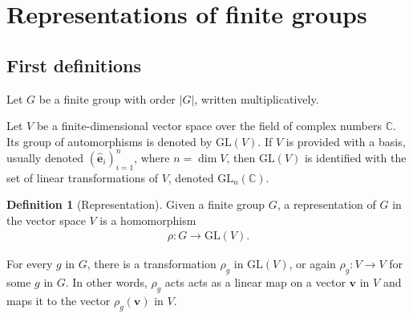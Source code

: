 \documentclass[12pt, a4paper, twoside]{article}
\theoremstyle{definition}
\newtheorem{definition}{Definition}[section]
\theoremstyle{remark}
\numberwithin{equation}{section}
\newcommand{\CC}{\mathbb{C}}
\newcommand{\1}{\mathbf{1}}
\newcommand{\0}{\mathbf{0}}
\newcommand{\GL}{\text{GL}}
\newcommand{\bas}{\mathbf{\hat{e}}}
\newcommand{\vvec}{\mathbf{v}}
\begin{document}





\clearpage{\thispagestyle{empty}\cleardoublepage}
{\hypersetup{linkcolor=black}
\tableofcontents
}

%

\section{Representations of finite groups}

\subsection{First definitions}

	Let $G$ be a finite group with order $|G|$, written multiplicatively.
	
	Let $V$ be a finite-dimensional vector space over the field of complex numbers $\CC$. Its group of automorphisms is denoted by $\GL(V)$. If $V$ is provided with a basis, usually denoted $(\bas_i)_{i=1}^n$, where $n = \dim V$, then $\GL(V)$ is identified with the set of linear transformations of $V$, denoted $\GL_n(\CC)$\cite[18.1]{DummitFoote}.
	
	\begin{definition}[Representation]\cite{Serre}
		Given a finite group $G$, a representation of $G$ in the vector space $V$ is a homomorphism
		\begin{align*}
			\rho: G \rightarrow \GL(V).
		\end{align*}
	\end{definition}
	For every $g$ in $G$, there is a transformation $\rho_g$ in $\GL(V)$, or again $\rho_g: V \rightarrow V$ for some $g$ in $G$. In other words, $\rho_g$ acts acts as a linear map on a vector $\vvec$ in $V$ and maps it to the vector $\rho_g(\vvec)$ in $V$.
	
\end{document}
